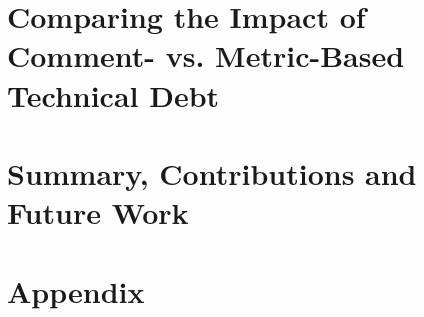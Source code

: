 \documentclass[12pt]{report}
\begin{document}
\chapter{Comparing the Impact of Comment- vs. Metric-Based Technical Debt}
\label{chapter4}


\chapter{Summary, Contributions and Future Work}
\label{conclusion}



\chapter{Appendix}
\label{appendix}


  

\end{document}
